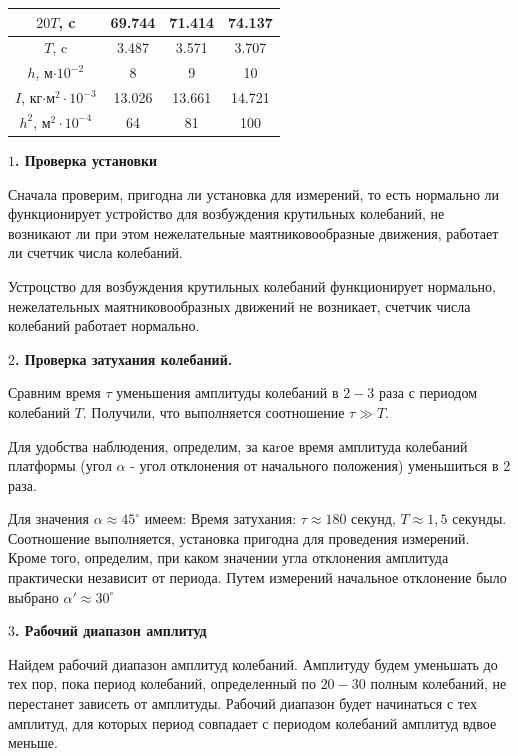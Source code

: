 \documentclass[a4paper,12pt]{article} %
\begin{document}
\begin{center}
\begin{tabular}{|c|c|c|c|}
\hline
$20T$, c                  & 69.744 & 71.414 & 74.137\\ 
\hline 
$T$,   c                  & 3.487 & 3.571 & 3.707\\ 
\hline 
$h$, м$\cdot 10^{-2}$     & 8 & 9 & 10\\ 
\hline 
$I$, кг$\cdot$м$^2\cdot 10^{-3}$  & 13.026 & 13.661 & 14.721\\ 
\hline 
$h^2$, м$^2\cdot 10^{-4}$ & 64 & 81 & 100\\ 
\hline
\end{tabular}
\end{center}






{\bf $1$. Проверка установки} 

Сначала проверим, пригодна ли установка для измерений, то есть нормально ли функционирует устройство для возбуждения крутильных колебаний, не возникают ли при этом нежелательные маятниковообразные движения, работает ли счетчик числа колебаний.

Устроцство для возбуждения крутильных колебаний функционирует нормально, нежелательных маятниковообразных движений не возникает, счетчик числа колебаний работает нормально.

{\bf $2$. Проверка затухания колебаний.}

Сравним время $\tau$ уменьшения амплитуды колебаний в $2-3$ раза с периодом колебаний $T$. Получили, что выполняется соотношение $\tau \gg T.$

Для удобства наблюдения, определим, за каrое время амплитуда колебаний платформы (угол $\alpha$ - угол отклонения от начального положения) уменьшиться в 2 раза.
		
Для значения $\alpha \approx 45^{\circ}$ имеем: Время затухания: $\tau \approx 180$ секунд, $T \approx 1,5$ секунды. Соотношение выполняется, установка пригодна для проведения измерений. Кроме того, определим, при каком значении угла отклонения амплитуда практически независит от периода. Путем измерений начальное отклонение было выбрано $\alpha' \approx 30^{\circ}$

{\bf $3$. Рабочий диапазон амплитуд}

Найдем рабочий диапазон амплитуд колебаний. Амплитуду будем уменьшать до тех пор, пока период колебаний, определенный по $20-30$ полным колебаний, не перестанет зависеть от амплитуды. Рабочий диапазон будет начинаться с тех амплитуд, для которых период совпадает с периодом колебаний амплитуд вдвое меньше.
\end{document}
